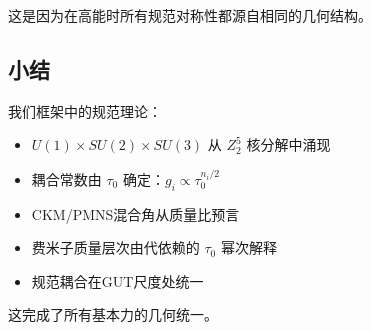 这是因为在高能时所有规范对称性都源自相同的几何结构。

\subsection{小结}

我们框架中的规范理论：
\begin{itemize}
    \item $U(1) \times SU(2) \times SU(3)$ 从 $Z_2^5$ 核分解中涌现
    \item 耦合常数由 $\tau_0$ 确定：$g_i \propto \tau_0^{n_i/2}$
    \item CKM/PMNS混合角从质量比预言
    \item 费米子质量层次由代依赖的 $\tau_0$ 幂次解释
    \item 规范耦合在GUT尺度处统一
\end{itemize}

这完成了所有基本力的几何统一。
